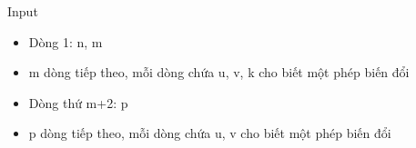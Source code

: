 Input  
\begin{itemize}
	\item     Dòng 1: n, m   
	\item     m dòng tiếp theo, mỗi dòng chứa u, v, k cho biết một phép biến đổi   
	\item     Dòng thứ m+2: p   
	\item     p dòng tiếp theo, mỗi dòng chứa u, v cho biết một phép biến đổi    
\\
\end{itemize}